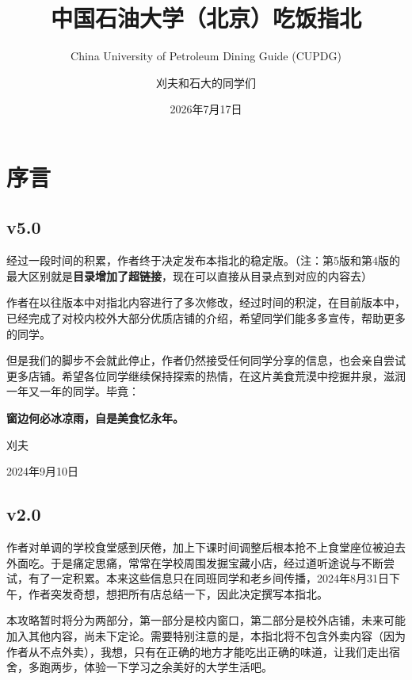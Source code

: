 \documentclass[lang=cn,color=blue,12pt,scheme=chinese,chinesefont=nofont]{elegantbook}
\title{中国石油大学（北京）吃饭指北}
\subtitle{China University of Petroleum Dining Guide {\customfont (CUPDG)}}
\author{刈夫和石大的同学们}
\date{2026年7月17日}
\newcommand{\xw}[1]{{\CJKfamily{xw}#1}}
\begin{document}
\maketitle

\frontmatter
\tableofcontents

\chapter*{序言}

\section{v5.0}
\setlength{\parindent}{2em}

经过一段时间的积累，作者终于决定发布本指北的稳定版。（注：第5版和第4版的最大区别就是\textbf{目录增加了超链接}，现在可以直接从目录点到对应的内容去）

作者在以往版本中对指北内容进行了多次修改，经过时间的积淀，在目前版本中，已经完成了对校内校外大部分优质店铺的介绍，希望同学们能多多宣传，帮助更多的同学。

但是我们的脚步不会就此停止，作者仍然接受任何同学分享的信息，也会亲自尝试更多店铺。希望各位同学继续保持探索的热情，在这片美食荒漠中挖掘井泉，滋润一年又一年的同学。毕竟：

\textbf{窗边何必冰凉雨，自是美食忆永年。}
\vspace{16.8pt}
\begin{flushright}
    \xw{刈夫}

    2024年9月10日
\end{flushright}

\section{v2.0}
\setlength{\parindent}{2em}

作者对单调的学校食堂感到厌倦，加上下课时间调整后根本抢不上食堂座位被迫去外面吃。于是痛定思痛，常常在学校周围发掘宝藏小店，经过道听途说与不断尝试，有了一定积累。本来这些信息只在同班同学和老乡间传播，2024年8月31日下午，作者突发奇想，想把所有店总结一下，因此决定撰写本指北。

本攻略暂时将分为两部分，第一部分是校内窗口，第二部分是校外店铺，未来可能加入其他内容，尚未下定论。需要特别注意的是，本指北将不包含外卖内容（因为作者从不点外卖），我想，只有在正确的地方才能吃出正确的味道，让我们走出宿舍，多跑两步，体验一下学习之余美好的大学生活吧。
\end{document}
